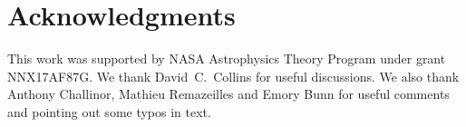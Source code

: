 \section*{Acknowledgments}

This work was supported by NASA Astrophysics Theory Program under grant NNX17AF87G.  We thank David~C.~Collins for useful discussions.  We also thank Anthony Challinor, Mathieu Remazeilles and Emory Bunn for useful comments and pointing out some typos in text.


